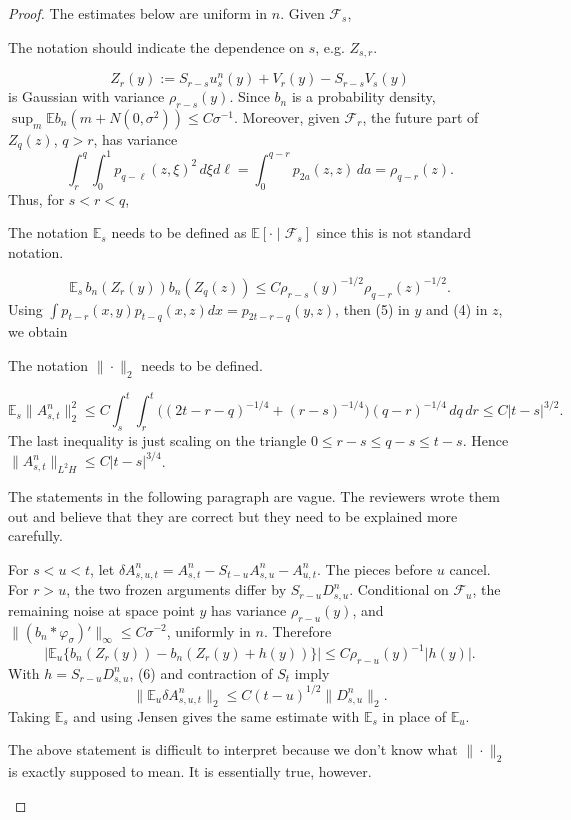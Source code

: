 \documentclass[12pt]{article}
\newcommand{\E}{\mathbb E}
\newcommand{\1}{\mathbf 1}
\newcommand{\calF}{\mathcal F}
\newcommand{\review}[1]{\begin{reviewbox}#1\end{reviewbox}}
\begin{document}
\begin{proof}
The estimates below are uniform in \(n\).  Given \(\calF_s\),
\review{The notation should indicate the dependence on $s$, e.g. $Z_{s,r}$.}
\[
Z_r(y):=S_{r-s}u_s^n(y)+V_r(y)-S_{r-s}V_s(y)
\]
is Gaussian with variance \(\rho_{r-s}(y)\).  Since \(b_n\) is a probability
density, \(\sup_m\E b_n(m+N(0,\sigma^2))\le C\sigma^{-1}\).  Moreover, given
\(\calF_r\), the future part of \(Z_q(z)\), \(q>r\), has variance
\[
 \int_r^q\!\!\int_0^1p_{q-\ell}(z,\xi)^2\,d\xi d\ell
 =\int_0^{q-r}p_{2a}(z,z)\,da=\rho_{q-r}(z).
\]
Thus, for \(s<r<q\),
\review{The notation $\mathbb{E}_s$ needs to be defined as $\mathbb{E}[\cdot\mid \mathcal{F}_s]$ since this is not standard notation.}
\[
 \E_s\,b_n(Z_r(y))b_n(Z_q(z))
 \le C\rho_{r-s}(y)^{-1/2}\rho_{q-r}(z)^{-1/2}.              \tag{9}
\]
Using
\(\int p_{t-r}(x,y)p_{t-q}(x,z)dx=p_{2t-r-q}(y,z)\), then (5) in \(y\) and
(4) in \(z\), we obtain
\review{The notation $\|\cdot\|_2$ needs to be defined.}
\[
 \E_s\|A^n_{s,t}\|_2^2
 \le C\!\int_s^t\!\!\int_r^t
      \bigl((2t-r-q)^{-1/4}+(r-s)^{-1/4}\bigr)(q-r)^{-1/4}\,dq\,dr
 \le C|t-s|^{3/2}.                                          \tag{10}
\]
The last inequality is just scaling on the triangle
\(0\le r-s\le q-s\le t-s\).  Hence
\(\|A^n_{s,t}\|_{L^2H}\le C|t-s|^{3/4}\).

\review{The statements in the following paragraph are vague. The reviewers wrote them out and believe that they are correct but they need to be explained more carefully.}
For \(s<u<t\), let
\(\delta A^n_{s,u,t}=A^n_{s,t}-S_{t-u}A^n_{s,u}-A^n_{u,t}\).  The pieces before
\(u\) cancel.  For \(r>u\), the two frozen arguments differ by
\(S_{r-u}D^n_{s,u}\).  Conditional on \(\calF_u\), the remaining noise at
space point \(y\) has variance \(\rho_{r-u}(y)\), and
\(\|(b_n*\varphi_\sigma)'\|_\infty\le C\sigma^{-2}\), uniformly in \(n\).
Therefore
\[
 \left|\E_u\{b_n(Z_r(y))-b_n(Z_r(y)+h(y))\}\right|
      \le C\rho_{r-u}(y)^{-1}|h(y)|.
\]
With \(h=S_{r-u}D^n_{s,u}\), (6) and contraction of \(S_t\) imply
\[
        \|\E_u\delta A^n_{s,u,t}\|_2
        \le C(t-u)^{1/2}\|D^n_{s,u}\|_2 .                    \tag{11}
\]
Taking \(\E_s\) and using Jensen gives the same estimate with \(\E_s\) in
place of \(\E_u\).
\review{The above statement is difficult to interpret because we don't know what $\|\cdot\|_2$ is exactly supposed to mean. It is essentially true, however.}


\end{proof}
\end{document}
